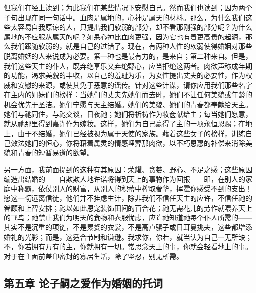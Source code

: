 但我们在经上读到；为此我们在某些情况下安慰自己。然而我们也读到；因为两个子句出现在同一句话中。血肉是属地的，心神是属天的材料。那么，为什么我们这些太容易自我原谅的人，只提出我们软弱的部分，却不看那刚强的部分呢？为什么属地的不应服从属天的呢？如果心神比血肉更强，因为它也有着更高贵的起源，那么我们跟随软弱的，就是自己的过错了。现在，有两种人性的软弱使得婚姻对那些脱离婚姻的人来说成为必要。第一种也是最有力的，是来自；第二种来自。但是，我们这些天主的仆人，既弃绝享乐又弃绝野心，应当拒绝这两者。肉欲声称成年期的功能，渴求美貌的丰收，以自己的羞耻为乐，为女性提出丈夫的必要性，作为权威和安慰的来源，或使其免于恶意的谣传。针对这些计谋，请你应用我们那些名字在主内的姐妹们的榜样：当她们的丈夫先她们而去时，她们不让任何美貌或年龄的机会优先于圣洁。她们宁愿与天主结婚。她们的美貌、她们的青春都奉献给天主。她们与祂同住，与祂交谈，日夜祂；她们将祈祷作为妆奁献给主；每当她们愿意，就从祂那里得到嘉许作为嫁妆。这样，她们为自己赢得了主的一项永恒恩赐；在地上，由于不结婚，她们已经被视为属于天使的家族。藉着这些女子的榜样，训练自己效法她们的恒心，你将藉着属灵的情感埋葬那肉欲，以不朽恩惠的补偿来消除美貌和青春的短暂易逝的欲望。\par

另一方面，我前面提到的这种有其原因：荣耀、贪婪、野心、不足之感；这些原因编造出结婚的——自欺欺人地许诺将得到天上的事物作为回报——即，在别人的家庭中称霸，依仗别人的财富，从别人的积蓄中榨取奢华，挥霍你感受不到的支出！愿这一切远离信徒，他们并不挂虑生计，除非我们不信任天主的应许，不信任祂的眷顾和上智安排；祂以如此恩宠装饰田间的百合花；祂无需花儿的劳作就喂养天上的飞鸟；祂禁止我们为明天的食物和衣服忧虑，应许祂知道祂每个仆人所需的——其实不是沉重的项链，不是累赘的衣裳，不是高卢骡子或日耳曼挑夫，这些都增添婚礼的光彩；而是，这适合节制和谦逊。我求你，你若，就当认为自己一无所缺；不，你若拥有万有的主，你就拥有一切。常思念天上的事，你就会轻看地上的事。对于在主面前盖印密封的寡居生活，除了坚忍，别无所需。\par


\subsection{第五章 论子嗣之爱作为婚姻的托词}

